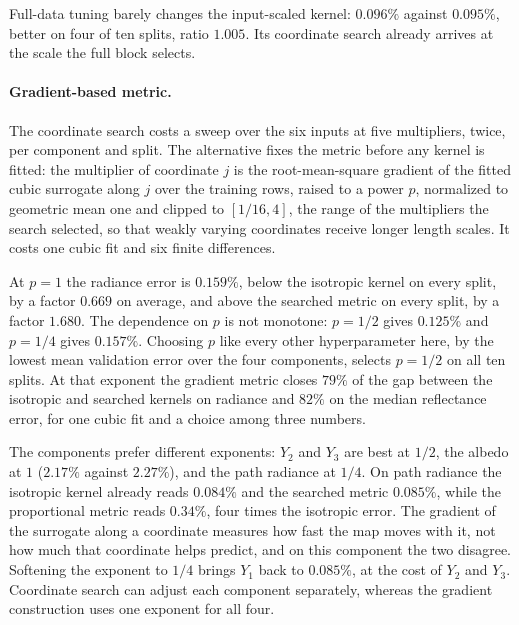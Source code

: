 Full-data tuning barely changes the input-scaled kernel: $0.096\%$ against $0.095\%$, better on
four of ten splits, ratio $1.005$. Its coordinate search already arrives at the scale the full
block selects.

\paragraph{Gradient-based metric.} The coordinate search costs a sweep over the six inputs at
five multipliers, twice, per component and split. The alternative fixes the metric before any
kernel is fitted: the multiplier of coordinate $j$ is the root-mean-square gradient of the fitted
cubic surrogate along $j$ over the training rows, raised to a power $p$, normalized to geometric
mean one and clipped to $[1/16, 4]$, the range of the multipliers the search selected, so that
weakly varying coordinates receive longer length scales. It costs one cubic fit and six finite differences.

At $p=1$ the radiance error is $0.159\%$, below the isotropic kernel on every split, by a factor
$0.669$ on average, and above the searched metric on every split, by a factor $1.680$. The
dependence on $p$ is not monotone: $p=1/2$ gives $0.125\%$ and $p=1/4$ gives $0.157\%$. Choosing
$p$ like every other hyperparameter here, by the lowest mean validation error over the four
components, selects $p=1/2$ on all ten splits. At that exponent the gradient metric closes $79\%$
of the gap between the isotropic and searched kernels on radiance and $82\%$ on the median
reflectance error, for one cubic fit and a choice among three numbers.

The components prefer different exponents: $Y_2$ and $Y_3$ are best at $1/2$, the albedo at $1$
($2.17\%$ against $2.27\%$), and the path radiance at $1/4$. On path radiance the isotropic kernel
already reads $0.084\%$ and the searched metric $0.085\%$, while the proportional metric reads
$0.34\%$, four times the isotropic error. The gradient of the surrogate along a coordinate
measures how fast the map moves with it, not how much that coordinate helps predict, and on this
component the two disagree. Softening the exponent to $1/4$ brings $Y_1$ back to $0.085\%$, at the
cost of $Y_2$ and $Y_3$. Coordinate search can adjust each component separately, whereas the
gradient construction uses one exponent for all four.
